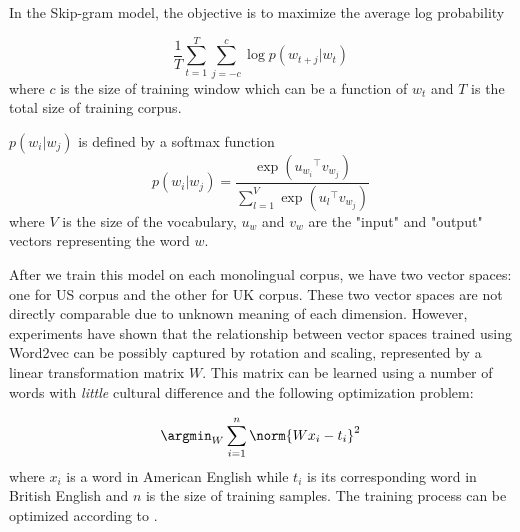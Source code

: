 In the Skip-gram model, the objective is to maximize the average
log probability

\begin{equation*}
\frac{1}{T} \sum_{t=1}^{T} \sum_{j=-c}^{c} \log p(w_{t+j}|w_t)
\end{equation*}
where $c$ is the size of training window which can be a function of $w_t$ and
$T$ is the total size of training corpus.

$p(w_i|w_j)$ is defined by a softmax function
\begin{equation*}
p(w_i|w_j)=\frac{\exp(u_{w_i} {}^{\top} v_{w_j})}{\sum_{l = 1}^{V} \exp(u_l {}^{\top} v_{w_j})}
\end{equation*}
where $V$ is the size of the vocabulary, $u_w$ and $v_w$ are the "input" and "output" vectors representing the word $w$.

After we train this model on each monolingual corpus, we have two vector spaces: one for US corpus and the other for UK corpus. These two vector spaces
are not directly comparable due to unknown meaning of each dimension.
However, experiments \cite{Mikolov:2013tp} have shown that the relationship
between vector spaces trained using Word2vec can be possibly captured by
rotation and scaling, represented by a linear transformation matrix $W$.
This matrix can be learned using a number of words with {\em little}
cultural difference and the following optimization problem:

\begin{equation*}
\argmin_{W}\sum_{i=1}^{n}\norm{Wx_{i}-t_{i}}^2
\end{equation*}
where $x_{i}$ is a word in American English while $t_{i}$ is its
corresponding word in British English and $n$ is the size of
training samples.
The training process can be optimized according to
\cite{Mikolov2013distributed}.
